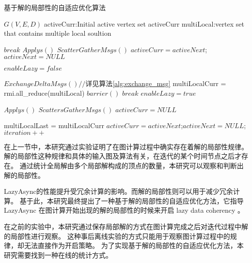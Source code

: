 \begin{algorithm}[!htbp]
  \small
  \caption{基于解的局部性的自适应优化算法}\label{alg:adaptive}
  \begin{algorithmic}[1] 
      \Require $G(V, E, D)$
      \Require activeCurr:\quad Initial active vertex set activeCurr
      \Require multiLocal:\quad vertex set that contains multiple local soultion 

      \State $break$
      \EndIf
      \State $Applys()$
      \State $ScatterGatherMsgs()$
      \State $activeCurr = activeNext$;\quad $activeNext = NULL$
      \EndFor
      \EndIf

      \State $enableLazy = false$

      \State $ExchangeDeltaMsgs()//$详见算法\ref{alg:exchange_msg}
      \State multiLocalCurr = rmi.all\_reduce(multiLocal)
      \State $barrier()$
      \State $break$
      \EndIf
      {
      \color{red}
      \State $enableLazy = true$
      \EndIf
      }
      

      \State $Applys()$
      \State $ScattersGatherMsgs()$
      \State $activeCurr = NULL$
      \EndFor

      \State multiLocalLast = multiLocalCurr
      \State $activeCurr = activeNext$;\quad $activeNext = NULL$; \quad $iteration ++$
      \EndWhile
  \end{algorithmic}
\end{algorithm}

在上一节中，本研究通过实验证明了在图计算过程中确实存在着解的局部性规律。
解的局部性这种规律和具体的输入图及算法有关，在迭代的某个时间节点之后才存在。
通过统计全局解由多个局部解构成的顶点的数量，本研究可以观察和判断出解的局部性。


LazyAsync的性能提升受冗余计算的影响。而解的局部性则可以用于减少冗余计算。
基于此，本研究最终提出了一种基于解的局部性的自适应优化方法，它指导LazyAsync
在图计算开始出现的解的局部性的时候来开启 lazy data coherency 。

在之前的实验中，本研究通过保存局部解的方式在图计算完成之后对迭代过程中解的局部性进行观察。
这种事后离线实验的方式只能用于观察图计算过程中的规律，却无法直接作为开启策略。
为了实现基于解的局部性的自适应优化方法，本研究需要找到一种在线的统计方式。

